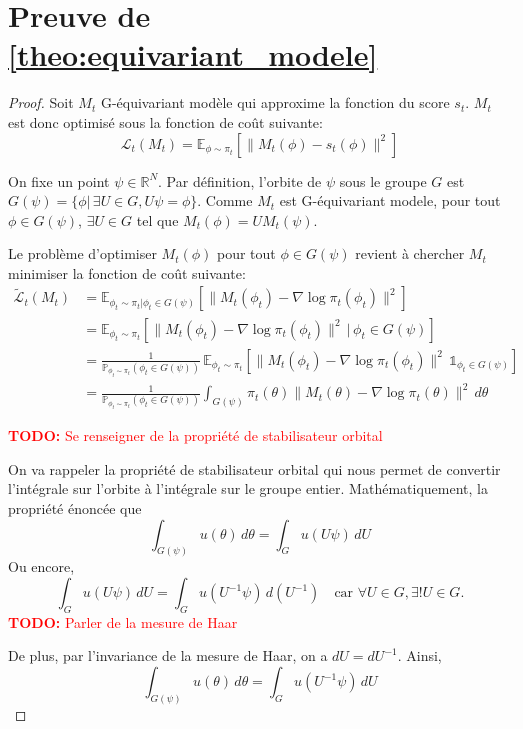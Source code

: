 \documentclass[a4paper,10pt]{article}
\theoremstyle{definition} %
\theoremstyle{definition} %
\theoremstyle{definition} %
\theoremstyle{definition} %
\newcommand{\todo}[1]{\textcolor{red}{\textbf{TODO:} #1}}
\begin{document}
\section{Preuve de \cref{theo:equivariant_modele}}\label{sec:proof_equivariant_modele}
\begin{proof}
Soit $M_t$ G-équivariant modèle qui approxime la fonction du score $s_t$. $M_t$ est donc optimisé sous la fonction de coût suivante:
\[
\mathcal{L}_t(M_t) = \mathbb{E}_{\phi \sim \pi_t} \left[ \| M_t(\phi) - s_t(\phi) \|^2 \right]
\]

On fixe un point $\psi \in \mathbb{R}^N$. Par définition, l'orbite de $\psi$ sous le groupe $G$ est $G(\psi) = \{ \phi |\, \exists U \in G, U \psi = \phi \}$. Comme $M_t$ est G-équivariant modele, pour tout $\phi \in G(\psi)$, $\exists U \in G$ tel que $M_t(\phi) = U M_t(\psi)$.

Le problème d'optimiser $M_t(\phi)$ pour tout $\phi \in G(\psi)$ revient à chercher $M_t$ minimiser la fonction de coût suivante:
\begin{align*}
\widetilde{\mathcal{L}}_t(M_t) &= \mathbb{E}_{\phi_t \sim \pi_t | \phi_t \in G(\psi)} \left[ \| M_t(\phi_t) - \nabla \log \pi_t(\phi_t) \|^2 \right]\\ 
&= \mathbb{E}_{\phi_t \sim \pi_t} \left[ \| M_t(\phi_t) - \nabla \log \pi_t(\phi_t) \|^2 \,|\, \phi_t \in G(\psi) \right] \\
&= \frac{1}{\mathbb{P}_{\phi_t \sim \pi_t} (\phi_t \in G(\psi))}\,\mathbb{E}_{\phi_t \sim \pi_t} \left[ \| M_t(\phi_t) - \nabla \log \pi_t(\phi_t) \|^2\, \mathbb{1}_{\phi_t \in G(\psi)} \right] \\
&= \frac{1}{\mathbb{P}_{\phi_t \sim \pi_t} (\phi_t \in G(\psi))} \int_{G(\psi)} \pi_t(\theta) \| M_t(\theta) - \nabla \log \pi_t(\theta) \|^2 \, d\theta
\end{align*}

\todo{Se renseigner de la propriété de stabilisateur orbital}

On va rappeler la propriété de stabilisateur orbital qui nous permet de convertir l'intégrale sur l'orbite à l'intégrale sur le groupe entier. Mathématiquement, la propriété énoncée que  
\[
\int_{G(\psi)} u(\theta) \, d\theta = \int_G u(U\psi) \, dU
\]
Ou encore,
\[
\int_G u(U\psi) \, dU = \int_G u(U^{-1}\psi) \, d(U^{-1}) \quad \text{car } \forall U \in G, \exists ! U \in G.
\]
\todo{Parler de la mesure de Haar}

De plus, par l'invariance de la mesure de Haar, on a $dU = dU^{-1}$. Ainsi,
\[
\int_{G(\psi)} u(\theta) \, d\theta = \int_G u(U^{-1}\psi) \, dU
\]


\end{proof}
\end{document}

